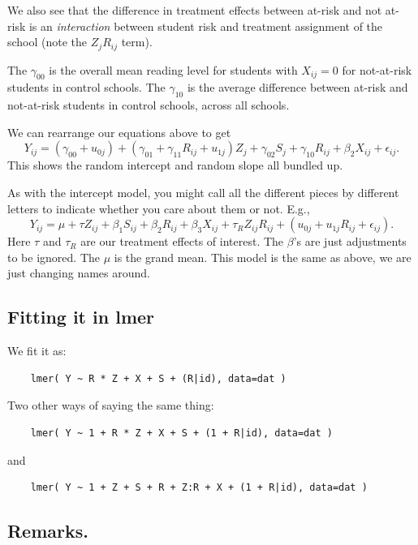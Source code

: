 \documentclass[
  letterpaper,
  DIV=11,
  numbers=noendperiod]{scrreprt}
\begin{document}
We also see that the difference in treatment effects between at-risk and
not at-risk is an \emph{interaction} between student risk and treatment
assignment of the school (note the \(Z_j R_{ij}\) term).

The \(\gamma_{00}\) is the overall mean reading level for students with
\(X_{ij}=0\) for not-at-risk students in control schools. The
\(\gamma_{10}\) is the average difference between at-risk and
not-at-risk students in control schools, across all schools.

We can rearrange our equations above to get
\[Y_{ij} = ( \gamma_{00} + u_{0j}) + (\gamma_{01} + \gamma_{11} R_{ij} + u_{1j} ) Z_{j} + \gamma_{02} S_{j} + \gamma_{10} R_{ij} + \beta_{2} X_{ij} + \epsilon_{ij} .\]
This shows the random intercept and random slope all bundled up.

As with the intercept model, you might call all the different pieces by
different letters to indicate whether you care about them or not. E.g.,
\[Y_{ij} = \mu + \tau Z_{ij}  + \beta_1 S_{ij} + \beta_2 R_{ij} + \beta_3 X_{ij} + \tau_{R} Z_{ij} R_{ij}  + (u_{0j} +  u_{1j} R_{ij} + \epsilon_{ij}) .\]
Here \(\tau\) and \(\tau_R\) are our treatment effects of interest. The
\(\beta\)'s are just adjustments to be ignored. The \(\mu\) is the grand
mean. This model is the same as above, we are just changing names
around.

\hypertarget{fitting-it-in-lmer-1}{%
\subsection{Fitting it in lmer}\label{fitting-it-in-lmer-1}}

We fit it as:

\begin{verbatim}
    lmer( Y ~ R * Z + X + S + (R|id), data=dat )
\end{verbatim}

Two other ways of saying the same thing:

\begin{verbatim}
    lmer( Y ~ 1 + R * Z + X + S + (1 + R|id), data=dat )
\end{verbatim}

and

\begin{verbatim}
    lmer( Y ~ 1 + Z + S + R + Z:R + X + (1 + R|id), data=dat )
\end{verbatim}

\hypertarget{remarks.-4}{%
\subsection{Remarks.}\label{remarks.-4}}
\end{document}
